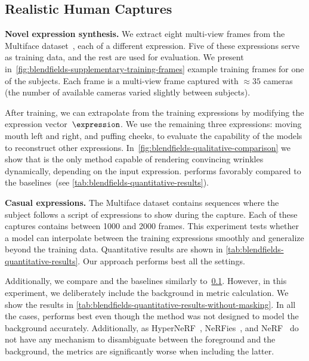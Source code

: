   \subsection{Realistic Human Captures}
    \label{subsec:blendfields-realistic-human-captures}
    \noindent\textbf{Novel expression synthesis.}
    We extract eight multi-view frames from the Multiface
    dataset~\cite{wuu2022multiface}, each of a different expression.
    Five of these expressions serve as training data, and the rest are used for
    evaluation.
    We present in~\cref{fig:blendfields-supplementary-training-frames} example
    training frames for one of the subjects.
    Each frame is a multi-view frame captured with ${\approx} 35$ cameras (the
    number of available cameras varied slightly between subjects).

    After training, we can extrapolate from the training expressions by modifying
    the expression vector~$\expression$.
    We use the remaining three expressions: moving mouth left and right, and
    puffing cheeks, to evaluate the capability of the models to reconstruct other
    expressions.
    In~\cref{fig:blendfields-qualitative-comparison} we show that \blendfields is
    the only method capable of rendering convincing wrinkles dynamically,
    depending on the input expression.
    \blendfields performs favorably compared to the baselines~(see \cref{tab:blendfields-quantitative-results}).

    \noindent\textbf{Casual expressions.}
    The Multiface dataset contains sequences where the subject follows a script of
    expressions to show during the capture.
    Each of these captures contains between 1000 and 2000 frames.
    This experiment tests whether a model can interpolate between the training
    expressions smoothly and generalize beyond the training data.
    Quantitative results are shown in \cref{tab:blendfields-quantitative-results}.
    Our approach performs best all the settings.

    Additionally, we compare \blendfields and the baselines similarly
    to~\cref{subsec:blendfields-realistic-human-captures}.
    However, in this experiment, we deliberately include the background in metric
    calculation.
    We show the results in
    \cref{tab:blendfields-quantitative-results-without-masking}.
    In all the cases, \blendfields performs best even though the method was not
    designed to model the background accurately.
    Additionally, as HyperNeRF~\cite{park2021hypernerf},
    NeRFies~\cite{park2021nerfies}, and NeRF~\cite{mildenhall2020nerf} do not have
    any mechanism to disambiguate between the foreground and the background, the
    metrics are significantly worse when including the latter.

